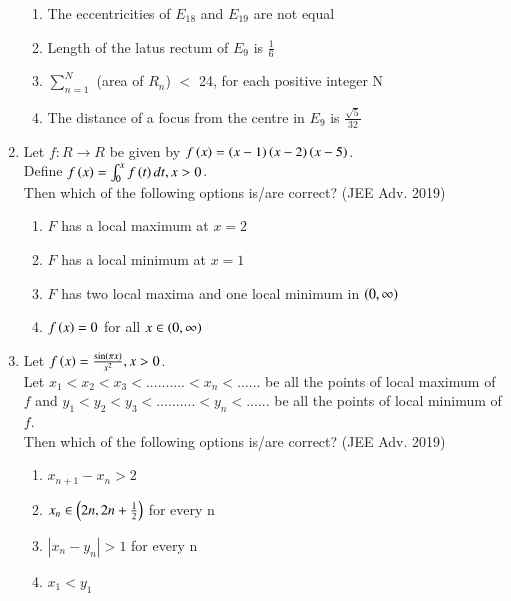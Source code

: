 \documentclass[journal,12pt,twocolumn]{IEEEtran}
\theoremstyle{remark}
\begin{document}
\begin{enumerate}
{            \begin{enumerate}
                \item The eccentricities of $E_{18}$ and $E_{19}$ are not equal
                \item Length of the latus rectum of $E_{9}$ is $\frac{1}{6}$
                \item $\sum_{n=1}^N$ (area of $R_n$) $<$ 24, for each positive integer N
                \item The distance of a focus from the centre in $E_9$ is $\frac{\sqrt{5}}{32}$
            \end{enumerate}
        
        }
    \item{
        
            Let $f: R\rightarrow R$ be given by $f\left(x\right) = \left(x-1\right)\left(x-2\right)\left(x-5\right)$.\\[6pt] 
            Define $f\left(x\right) = \int_0^x f\left(t\right)dt, x>0$.\\[3pt]
            Then which of the following options is/are correct?
             \hfill
                {(JEE Adv. 2019)}
            
            \begin{enumerate}
                \item $F$ has a local maximum at $x=2$
                \item $F$ has a local minimum at $x=1$
                \item $F$ has two local maxima and one local minimum in $\left(0,\infty\right)$
                \item $f\left(x\right) = 0$ for all $x \in \left(0,\infty\right)$
            \end{enumerate}
        
        }
        
    \item{
        
            Let $f\left(x\right) = \frac{\sin\left(\pi x\right)}{x^2}, x>0$.\\[3pt]
            Let $x_1 < x_2 < x_3 < .......... <x_n <......$ be all the points of local maximum of $f$ and $y_1 < y_2 < y_3 < .......... <y_n <......$ be all the points of local minimum of $f$.\\
            Then which of the following options is/are correct?
             \hfill
                {(JEE Adv. 2019)}
            
            \begin{enumerate}
                \item $x_{n+1} - x_{n} > 2$ 
                \item $x_{n} \in \left(2n, 2n+\frac{1}{2}\right)$ for every n
                \item $|x_{n} - y_{n}|> 1 $ for every n
                \item $x_{1} < y_{1}$
            \end{enumerate}
        
        }
    \end{enumerate}
\end{document}
